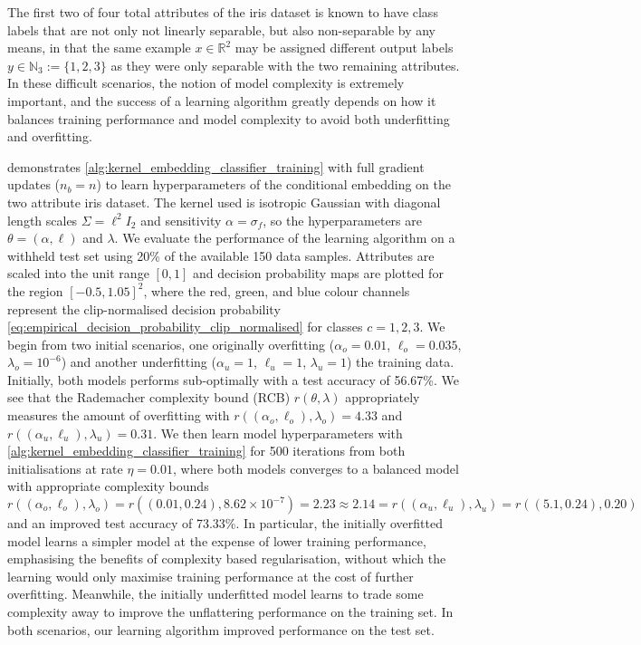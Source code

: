 \documentclass{article}
\begin{document}
		The first two of four total attributes of the iris dataset \citep{fisher1936use} is known to have class labels that are not only not linearly separable, but also non-separable by any means, in that the same example $x \in \mathbb{R}^{2}$ may be assigned different output labels $y \in \mathbb{N}_{3} := \{1, 2, 3\}$ as they were only separable with the two remaining attributes. In these difficult scenarios, the notion of model complexity is extremely important, and the success of a learning algorithm greatly depends on how it balances training performance and model complexity to avoid both underfitting and overfitting. 
		
		 demonstrates \cref{alg:kernel_embedding_classifier_training} with full gradient updates ($n_{b} = n$) to learn hyperparameters of the conditional embedding on the two attribute iris dataset. The kernel used is isotropic Gaussian with diagonal length scales $\Sigma = \ell^{2} I_{2}$ and sensitivity $\alpha = \sigma_{f}$, so the hyperparameters are $\theta = (\alpha, \ell)$ and $\lambda$. We evaluate the performance of the learning algorithm on a withheld test set using 20\% of the available 150 data samples. Attributes are scaled into the unit range $[0, 1]$ and decision probability maps are plotted for the region $[-0.5, 1.05]^{2}$, where the red, green, and blue colour channels represent the clip-normalised decision probability \eqref{eq:empirical_decision_probability_clip_normalised} for classes $c = 1, 2, 3$. We begin from two initial scenarios, one originally overfitting ($\alpha_{o} = 0.01$, $\ell_{o} = 0.035$, $\lambda_{o} = 10^{-6}$) and another underfitting ($\alpha_{u} = 1$, $\ell_{u} = 1$, $\lambda_{u} = 1$) the training data. Initially, both models performs sub-optimally with a test accuracy of 56.67\%. We see that the Rademacher complexity bound (RCB) $r(\theta, \lambda)$ appropriately measures the amount of overfitting with $r((\alpha_{o}, \ell_{o}), \lambda_{o}) = 4.33$ and $r((\alpha_{u}, \ell_{u}), \lambda_{u}) = 0.31$. We then learn model hyperparameters with \cref{alg:kernel_embedding_classifier_training} for 500 iterations from both initialisations at rate $\eta = 0.01$, where both models converges to a balanced model with appropriate complexity bounds $r((\alpha_{o}, \ell_{o}), \lambda_{o}) = r((0.01, 0.24), 8.62 \times 10^{-7}) = 2.23 \approx 2.14 = r((\alpha_{u}, \ell_{u}), \lambda_{u}) = r((5.1, 0.24), 0.20)$ and an improved test accuracy of 73.33\%. In particular, the initially overfitted model learns a simpler model at the expense of lower training performance, emphasising the benefits of complexity based regularisation, without which the learning would only maximise training performance at the cost of further overfitting. Meanwhile, the initially underfitted model learns to trade some complexity away to improve the unflattering performance on the training set. In both scenarios, our learning algorithm improved performance on the test set.
		
\end{document}
